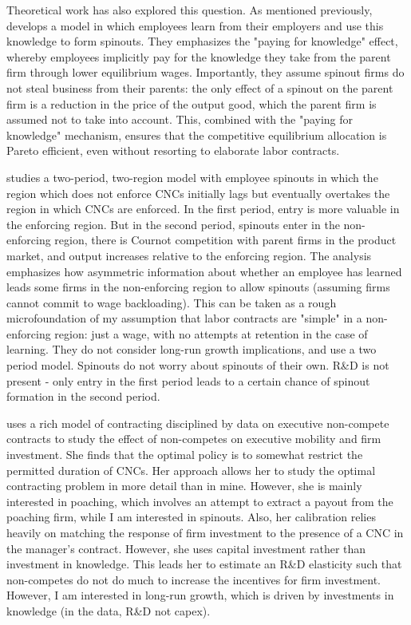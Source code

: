 \documentclass[12pt,english]{article}
\theoremstyle{remark}
\begin{document}
Theoretical work has also explored this question. As mentioned previously, \cite{franco_spin-outs:_2006} develops a model in which employees learn from their employers and use this knowledge to form spinouts. They emphasizes the "paying for knowledge" effect, whereby employees implicitly pay for the knowledge they take from the parent firm through lower equilibrium wages. Importantly, they assume spinout firms do not steal business from their parents: the only effect of a spinout on the parent firm is a reduction in the price of the output good, which the parent firm is assumed not to take into account. This, combined with the "paying for knowledge" mechanism, ensures that the competitive equilibrium allocation is Pareto efficient, even without resorting to elaborate labor contracts.

\cite{franco_covenants_2008} studies a two-period, two-region model with employee spinouts in which the region which does not enforce CNCs initially lags but eventually overtakes the region in which CNCs are enforced. In the first period, entry is more valuable in the enforcing region. But in the second period, spinouts enter in the non-enforcing region, there is Cournot competition with parent firms in the product market, and output increases relative to the enforcing region. The analysis emphasizes how asymmetric information about whether an employee has learned leads some firms in the non-enforcing region to allow spinouts (assuming firms cannot commit to wage backloading). This can be taken as a rough microfoundation of my assumption that labor contracts are "simple" in  a non-enforcing region: just a wage, with no attempts at retention in the case of learning. They do not consider long-run growth implications, and use a two period model. Spinouts do not worry about spinouts of their own. R\&D is not present - only entry in the first period leads to a certain chance of spinout formation in the second period. 

\cite{shi_restrictions_2018} uses a rich model of contracting disciplined by data on executive non-compete contracts to study the effect of non-competes on executive mobility and firm investment. She finds that the optimal policy is to somewhat restrict the permitted duration of CNCs. Her approach allows her to study the optimal contracting problem in more detail than in mine. However, she is mainly interested in poaching, which involves an attempt to extract a payout from the poaching firm, while I am interested in spinouts. Also, her calibration relies heavily on matching the response of firm investment to the presence of a CNC in the manager's contract. However, she uses capital investment rather than investment in knowledge. This leads her to estimate an R\&D elasticity such that non-competes do not do much to increase the incentives for firm investment. However, I am interested in long-run growth, which is driven by investments in knowledge (in the data, R\&D not capex).
\end{document}
